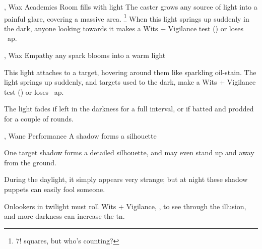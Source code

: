   {\mFire, \mAir}%
  {Wax}%
  {\duplicated}%
  {Academics}%
  {Room fills with light}%
  {
    The caster grows any source of light into a painful glare, covering a massive area.%
    \footnote{$7!$ squares, but who's counting?}
    When this light springs up suddenly in the dark, anyone looking towards it makes a Wits + Vigilance test () or loses ~\gls{ap}.
  }

  {\mFire, \mAir}%
  {Wax}%
  {\detailed}%
  {Empathy}%
  {any spark blooms into a warm light}%
  {
    This light attaches to a target, hovering around them like sparkling oil-stain.
    The light springs up suddenly, and targets used to the dark, make a Wits + Vigilance test () or loses ~\gls{ap}.

    The light fades if left in the darkness for a full \gls{interval}, or if batted and prodded for a couple of rounds.
  }

  {\mFire, \mAir}%
  {Wane}%
  {\detailed}%
  {Performance}%
  {A shadow forms a silhouette}%
  {
    One target shadow forms a detailed silhouette, and may even stand up and away from the ground.

    During the daylight, it simply appears very strange; but at night these shadow puppets can easily fool someone.

    \setcounter{track}{\value{spelllevel}}
    \addtocounter{track}{7}
    Onlookers in twilight must roll Wits + Vigilance, , to see through the illusion, and more darkness can increase the \gls{tn}.
  }

